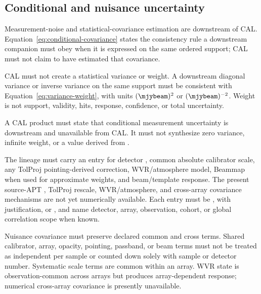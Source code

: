 \subsection{Conditional and nuisance uncertainty}

\begin{description}[style=nextline]
\item[\Req{032}: downstream conditional covariance boundary.]
  Measurement-noise and statistical-covariance estimation are downstream of
  CAL. Equation~\eqref{eq:conditional-covariance} states the consistency rule
  a downstream companion must obey when it is expressed on the same ordered
  support; CAL must not claim to have estimated that covariance.

\item[\Req{033}: scalar variance and weight boundary.]
  CAL must not create a statistical variance or weight. A downstream diagonal
  variance or inverse variance on the same support must be consistent with
  Equation~\eqref{eq:variance-weight}, with units \((\mjybeam)^2\) or
  \((\mjybeam)^{-2}\). Weight is not support, validity, hits, response,
  confidence, or total uncertainty.

\item[\Req{034}: unavailable conditional uncertainty.]
  A CAL product must state that conditional measurement uncertainty is
  downstream and unavailable from CAL. It must not synthesize zero variance,
  infinite weight, or a value derived from .

\item[\Req{035}: nuisance completeness ledger.]
  The lineage must carry an entry for detector , common
  absolute calibrator scale, any TolProj pointing-derived correction,
  WVR/atmosphere model, Beammap  when used for approximate weights,
  and beam/template response. The present source-APT , TolProj
  rescale, WVR/atmosphere, and cross-array covariance mechanisms are not yet
  numerically available. Each entry must be ,
   with justification, or , and name
  detector, array, observation, cohort, or global correlation scope when
  known.

\item[\Req{036}: correlation preservation.]
  Nuisance covariance must preserve declared common and cross terms. Shared
  calibrator, array, opacity, pointing, passband, or beam terms must not be
  treated as independent per sample or counted down solely with sample or
  detector number. Systematic scale terms are common within an array. WVR
  state is observation-common across arrays but produces array-dependent
  response; numerical cross-array covariance is presently unavailable.


\end{description}

